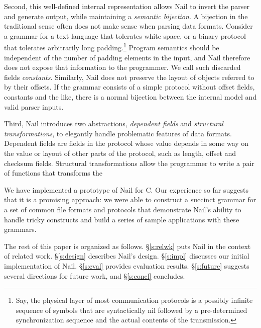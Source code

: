 Second, this well-defined internal representation allows Nail to invert the
parser and generate output, while maintaining a \emph{semantic bijection}.
A bijection in the traditional sense often does not make sense when parsing data formats. 
Consider a grammar for a
text language that tolerates white space, or a binary protocol that tolerates
arbitrarily long padding.\footnote{Say, the physical layer of most communication
  protocols is a possibly infinite sequence of symbols that are syntactically
  nil followed by a pre-determined synchronization sequence and the actual
  contents of the transmission.} Program semantics should be
independent of the number of padding elements in the input, and Nail therefore
does not expose that information to the programmer. We call such discarded
fields \emph{constants}. 
Similarly, Nail does not preserve the layout of
objects referred to by their offsets. If the grammar consists of a simple protocol without offset
fields, constants and the like, there is a normal bijection between the internal model and valid
parser inputs.




Third, Nail introduces two abstractions, \emph{dependent fields} and \emph{structural transformations}, to
elegantly handle problematic features of data formats. Dependent fields are fields in the protocol
whose value depends in some way on the value or layout of other parts of the protocol, such as
length, offset and checksum fields. Structural transformations allow the programmer to write a pair
of functions that transforms the \XXX[TODO]


We have implemented a prototype of Nail for C\@.  Our experience
so far suggests that it is a promising approach: we were able to construct
a succinct grammar for a set of common file formats and protocols that demonstrate Nail's ability to
handle tricky constructs and build a series of sample applications with these grammars. 

The rest of this paper is organized as follows.  \S\ref{s:relwk}
puts Nail in the context of related work.  \S\ref{s:design} describes
Nail's design.  \S\ref{s:impl} discusses our initial implementation
of Nail.  \S\ref{s:eval} provides evaluation results.
\S\ref{s:future} suggests several directions for future work, and
\S\ref{s:concl} concludes.

